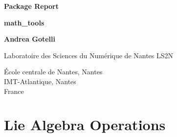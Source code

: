 \documentclass[12pt,a4paper]{book}
\begin{document}
\begin{titlepage}
   \begin{center}
       \vspace*{1cm}

		\textbf{Package Report}		
		
		\vspace{1.5cm}
		
        \Large{\textbf{math\_tools}}

            
        \vspace{1.5cm}

        \textbf{Andrea Gotelli}

        \vfill
            
            
        \vspace{0.8cm}
     
            
		\begin{flushleft}
			Laboratoire des Sciences du Numérique de Nantes LS2N
		\end{flushleft}
        École centrale de Nantes, Nantes\\
        IMT-Atlantique, Nantes\\
        France\\
       
       
            
   \end{center}
  
\end{titlepage}


\tableofcontents

\listoffigures






\chapter{Lie Algebra Operations}
\end{document}
